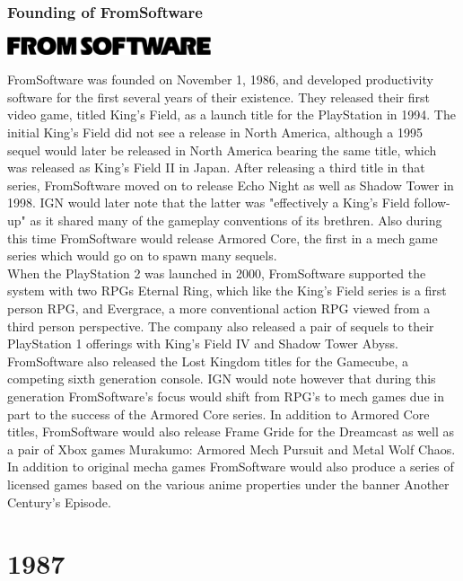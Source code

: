 \documentclass[11pt]{report}
\begin{document}
\subsection{Founding of FromSoftware}
\vspace{2mm}\begin{center}\includegraphics[width=6cm]{./img/fromSoftwareLogo.jpg}\end{center}
FromSoftware was founded on November 1, 1986, and developed productivity software for the first several years of their existence. They released their first video game, titled King's Field, as a launch title for the PlayStation in 1994. The initial King's Field did not see a release in North America, although a 1995 sequel would later be released in North America bearing the same title, which was released as King's Field II in Japan. After releasing a third title in that series, FromSoftware moved on to release Echo Night as well as Shadow Tower in 1998. IGN would later note that the latter was "effectively a King's Field follow-up" as it shared many of the gameplay conventions of its brethren. Also during this time FromSoftware would release Armored Core, the first in a mech game series which would go on to spawn many sequels.\\
\indent When the PlayStation 2 was launched in 2000, FromSoftware supported the system with two RPGs Eternal Ring, which like the King's Field series is a first person RPG, and Evergrace, a more conventional action RPG viewed from a third person perspective. The company also released a pair of sequels to their PlayStation 1 offerings with King's Field IV and Shadow Tower Abyss. FromSoftware also released the Lost Kingdom titles for the Gamecube, a competing sixth generation console. IGN would note however that during this generation FromSoftware's focus would shift from RPG's to mech games due in part to the success of the Armored Core series. In addition to Armored Core titles, FromSoftware would also release Frame Gride for the Dreamcast as well as a pair of Xbox games Murakumo: Armored Mech Pursuit and Metal Wolf Chaos. In addition to original mecha games FromSoftware would also produce a series of licensed games based on the various anime properties under the banner Another Century's Episode.

\chapter{1987}
\end{document}
